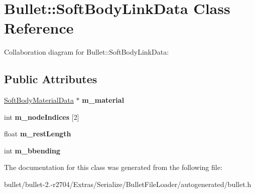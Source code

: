 \hypertarget{class_bullet_1_1_soft_body_link_data}{\section{Bullet\+:\+:Soft\+Body\+Link\+Data Class Reference}
\label{class_bullet_1_1_soft_body_link_data}
}


Collaboration diagram for Bullet\+:\+:Soft\+Body\+Link\+Data\+:
\subsection*{Public Attributes}
\begin{DoxyCompactItemize}
\item 
\hypertarget{class_bullet_1_1_soft_body_link_data_a990f79fd9dd4a7d189e95245799f7bcf}{\hyperlink{class_bullet_1_1_soft_body_material_data}{Soft\+Body\+Material\+Data} $\ast$ {\bfseries m\+\_\+material}}\label{class_bullet_1_1_soft_body_link_data_a990f79fd9dd4a7d189e95245799f7bcf}

\item 
\hypertarget{class_bullet_1_1_soft_body_link_data_a84f7a355f76ee364d94a4748a60d6cdd}{int {\bfseries m\+\_\+node\+Indices} \mbox{[}2\mbox{]}}\label{class_bullet_1_1_soft_body_link_data_a84f7a355f76ee364d94a4748a60d6cdd}

\item 
\hypertarget{class_bullet_1_1_soft_body_link_data_adbd00844886b15273aa886831e2bd311}{float {\bfseries m\+\_\+rest\+Length}}\label{class_bullet_1_1_soft_body_link_data_adbd00844886b15273aa886831e2bd311}

\item 
\hypertarget{class_bullet_1_1_soft_body_link_data_a17bd32f34b9c5f2642c50c2631f326f4}{int {\bfseries m\+\_\+bbending}}\label{class_bullet_1_1_soft_body_link_data_a17bd32f34b9c5f2642c50c2631f326f4}

\end{DoxyCompactItemize}


The documentation for this class was generated from the following file\+:\begin{DoxyCompactItemize}
\item 
bullet/bullet-\/2.-\/r2704/\+Extras/\+Serialize/\+Bullet\+File\+Loader/autogenerated/bullet.\+h\end{DoxyCompactItemize}
